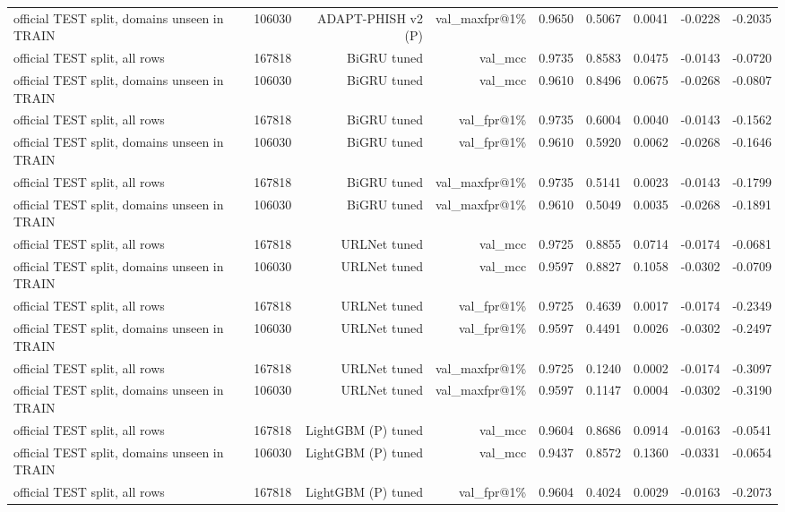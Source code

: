 \begin{table}[t]
\begin{tabular}{llrrrrrrr}
official TEST split, domains unseen in TRAIN & 106030 & ADAPT-PHISH v2 (P) & val\_maxfpr@1\% & 0.9650 & 0.5067 & 0.0041 & -0.0228 & -0.2035 \\
official TEST split, all rows & 167818 & BiGRU tuned & val\_mcc & 0.9735 & 0.8583 & 0.0475 & -0.0143 & -0.0720 \\
official TEST split, domains unseen in TRAIN & 106030 & BiGRU tuned & val\_mcc & 0.9610 & 0.8496 & 0.0675 & -0.0268 & -0.0807 \\
official TEST split, all rows & 167818 & BiGRU tuned & val\_fpr@1\% & 0.9735 & 0.6004 & 0.0040 & -0.0143 & -0.1562 \\
official TEST split, domains unseen in TRAIN & 106030 & BiGRU tuned & val\_fpr@1\% & 0.9610 & 0.5920 & 0.0062 & -0.0268 & -0.1646 \\
official TEST split, all rows & 167818 & BiGRU tuned & val\_maxfpr@1\% & 0.9735 & 0.5141 & 0.0023 & -0.0143 & -0.1799 \\
official TEST split, domains unseen in TRAIN & 106030 & BiGRU tuned & val\_maxfpr@1\% & 0.9610 & 0.5049 & 0.0035 & -0.0268 & -0.1891 \\
official TEST split, all rows & 167818 & URLNet tuned & val\_mcc & 0.9725 & 0.8855 & 0.0714 & -0.0174 & -0.0681 \\
official TEST split, domains unseen in TRAIN & 106030 & URLNet tuned & val\_mcc & 0.9597 & 0.8827 & 0.1058 & -0.0302 & -0.0709 \\
official TEST split, all rows & 167818 & URLNet tuned & val\_fpr@1\% & 0.9725 & 0.4639 & 0.0017 & -0.0174 & -0.2349 \\
official TEST split, domains unseen in TRAIN & 106030 & URLNet tuned & val\_fpr@1\% & 0.9597 & 0.4491 & 0.0026 & -0.0302 & -0.2497 \\
official TEST split, all rows & 167818 & URLNet tuned & val\_maxfpr@1\% & 0.9725 & 0.1240 & 0.0002 & -0.0174 & -0.3097 \\
official TEST split, domains unseen in TRAIN & 106030 & URLNet tuned & val\_maxfpr@1\% & 0.9597 & 0.1147 & 0.0004 & -0.0302 & -0.3190 \\
official TEST split, all rows & 167818 & LightGBM (P) tuned & val\_mcc & 0.9604 & 0.8686 & 0.0914 & -0.0163 & -0.0541 \\
official TEST split, domains unseen in TRAIN & 106030 & LightGBM (P) tuned & val\_mcc & 0.9437 & 0.8572 & 0.1360 & -0.0331 & -0.0654 \\
official TEST split, all rows & 167818 & LightGBM (P) tuned & val\_fpr@1\% & 0.9604 & 0.4024 & 0.0029 & -0.0163 & -0.2073 \\

\end{tabular}
\end{table}
